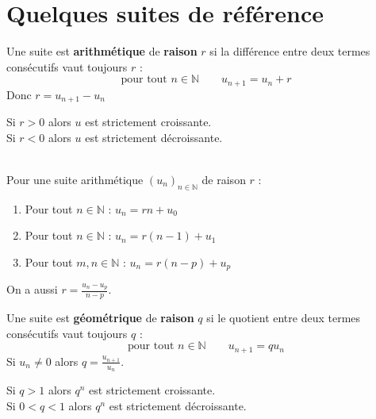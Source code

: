 \documentclass[main.tex]{subfiles}
\begin{document}
% 
\newpage 
{}  
\pagestyle{scrheadings} %
\onehalfspacing    
\section{Quelques suites de référence}
\begin{definition} Une suite est \textbf{arithmétique} de \textbf{raison} $r$ si la différence entre deux termes consécutifs vaut toujours $r$ :
	\setlength{\abovedisplayskip}{3pt}
	\setlength{\belowdisplayskip}{3pt}
	$$\text{pour tout $n\in\mathbb{N}$} \qquad u_{n+1}=u_{n}+r$$  
Donc $r=u_{n+1}-u_n$
\end{definition}
\begin{proposition}
 Si $r>0$ alors $u$ est strictement croissante.\\
 Si $r<0$ alors $u$ est strictement décroissante. 
\end{proposition}
\begin{proposition} \hfill \\
Pour une suite arithmétique  $(u_n)_{n\in\mathbb{N}}$ de raison $r$ :
	\begin{enumerate}[label=\textbullet,leftmargin=*]
		\item Pour tout $n\in\mathbb{N}$ : $u_{n}= rn + u_0$
		\item Pour tout $n\in\mathbb{N}$ : $u_{n}=r(n-1) + u_1$
		\item Pour tout $m,n\in\mathbb{N}$ : $u_{n}=r(n-p)+ u_p$
	\end{enumerate}
On a aussi $r=\frac{u_n-u_p}{n-p}$.
\end{proposition}
\begin{definition} Une suite est \textbf{géométrique} de \textbf{raison} $q$ si le quotient entre deux termes consécutifs vaut toujours $q$ :
	\setlength{\abovedisplayskip}{3pt}
	\setlength{\belowdisplayskip}{3pt}
	$$\text{pour tout $n\in\mathbb{N}$} \qquad u_{n+1}=qu_{n}$$  
Si $u_n\neq 0$ alors $q=\frac{u_{n+1}}{u_n}$.
\end{definition} 
\begin{proposition}
	Si $q>1$ alors $q^n$ est strictement croissante.\\
	Si $0<q<1$ alors $q^n$ est strictement décroissante. 
\end{proposition}
\end{document}
